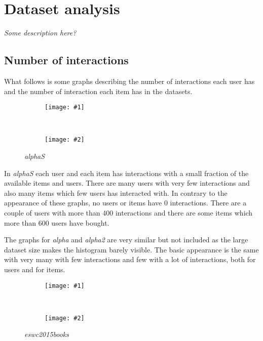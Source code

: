 
\newcommand{\twopic}[3]{
    \begin{figure}[h!]
        \begin{subfigure}[h!]{0.5\textwidth}
            \texttt{[image: \#1]}
        \end{subfigure}
        ~
        \begin{subfigure}[h!]{0.5\textwidth}
            \texttt{[image: \#2]}
        \end{subfigure}
        \caption{#3}
    \end{figure}
}


\section{Dataset analysis}\label{sec:results:data}

\textit{Some description here?}

\subsection{Number of interactions}\label{sec:result:interactions}

What follows is some graphs describing the number of interactions each user has and the number of interaction each item has in the datasets.

\FloatBarrier

\twopic{fig/data/alphaS_items_per_user.png}{fig/data/alphaS_users_per_item.png}{
\textit{alphaS}
}

In \textit{alphaS} each user and each item has interactions with a small fraction of the available items and users. There are many users with very few interactions and also many items which few users has interacted with. In contrary to the appearance of these graphs, no users or items have 0 interactions. There are a couple of users with more than 400 interactions and there are some items which more than 600 users have bought.

The graphs for \textit{alpha} and \textit{alpha2} are very similar but not included as the large dataset size makes the histogram barely visible. The basic appearance is the same with very many with few interactions and few with a lot of interactions, both for users and for items.

\newpage

\twopic{fig/data/eswc2015books_items_per_user.png}{fig/data/eswc2015books_users_per_item.png}{
\textit{eswc2015books}
}

